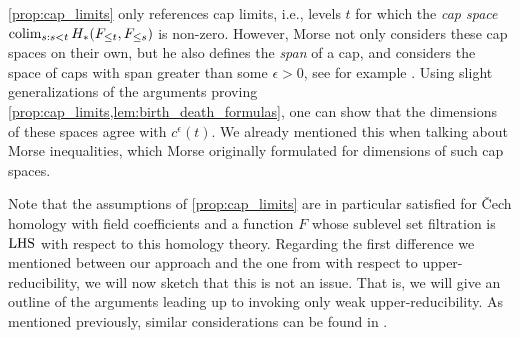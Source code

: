 \begin{rem}
	\cref{prop:cap_limits} only references cap limits, i.e., levels $t$ for which the \emph{cap space} $\operatorname*{colim}_{s: s < t} H_*(F_{\leq t}, F_{\leq s})$ is non-zero.
	However, Morse not only considers these cap spaces on their own, but he also defines the \emph{span} of a cap, and considers the space of caps with span greater than some $\epsilon > 0$, see for example \cite[Section 11]{Morse.1940}. 
	Using slight generalizations of the arguments proving \cref{prop:cap_limits,lem:birth_death_formulas}, one can show that the dimensions of these spaces agree with $c^{\epsilon}(t)$.
	We already mentioned this when talking about Morse inequalities, which Morse originally formulated for dimensions of such cap spaces.	
\end{rem}

Note that the assumptions of \cref{prop:cap_limits} are in particular satisfied for \v{C}ech homology with field coefficients and a function $F$ whose sublevel set filtration is $\mathrm{LHS}$ with respect to this homology theory.
Regarding the first difference we mentioned between our approach and the one from \cite[Theorem 8.1]{Morse.1938} with respect to upper-reducibility, we will now sketch that this is not an issue.
That is, we will give an outline of the arguments leading up to \cite[Theorem 8.1]{Morse.1938} invoking only weak upper-reducibility.
As mentioned previously, similar considerations can be found in \cite[Remark II.6.3]{Struwe.1988}.
